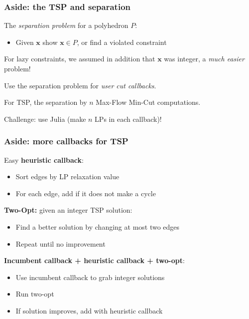 \documentclass{beamer}
\begin{document}
\begin{frame}
  \frametitle{Aside: the TSP and separation}

  The \emph{separation problem} for a polyhedron $P$:
  \begin{itemize}
  \item Given $\mathbf x$ show $\mathbf x \in P$, or find a violated constraint
  \end{itemize}\pause
  For lazy constraints, we assumed in addition that $\mathbf x$ was integer, a \emph{much easier} problem!\\\vspace{2em}
  
  Use the separation problem for \emph{user cut callbacks}.\\\vspace{2em}

  For TSP, the separation by $n$ Max-Flow Min-Cut
  computations.\\\vspace{2em}

  Challenge: use Julia (make $n$ LPs in each callback)!

\end{frame}
\begin{frame}
  \frametitle{Aside: more callbacks for TSP}

  Easy {\bf heuristic callback}:
  \begin{itemize}
  \item Sort edges by LP relaxation value
  \item For each edge, add if it does not make a cycle
  \end{itemize}\pause
  {\bf Two-Opt:} given an integer TSP solution:
  \begin{itemize}
  \item Find a better solution by changing at most two edges
  \item Repeat until no improvement
  \end{itemize}\pause
  {\bf Incumbent callback + heuristic callback + two-opt}:
  \begin{itemize}
  \item Use incumbent callback to grab integer solutions
  \item Run two-opt
  \item If solution improves, add with heuristic callback
  \end{itemize}  

\end{frame}
\end{document}
